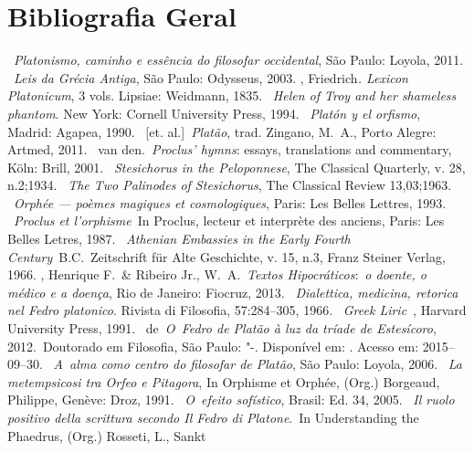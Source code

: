  

 

\section{Bibliografia Geral}


\begin{bibliohedra}
~\emph{Platonismo, caminho e essência do filosofar
  occidental}, São Paulo: Loyola, 2011.
~\emph{Leis da Grécia Antiga}, São Paulo: Odysseus,
  2003.
, Friedrich\emph{. Lexicon Platonicum}, 3 vols. Lipsiae: Weidmann,
  1835.
~\emph{Helen of Troy and her shameless phantom}. New York:
  Cornell University Press, 1994.
~\emph{Platón y el orfismo}, Madrid: Agapea, 1990.
~[et. al.]~\emph{Platão}, trad. Zingano, M.~A., Porto
  Alegre: Artmed, 2011.
~van den.~\emph{Proclus' hymns}: essays, translations and
  commentary, Köln: Brill, 2001.
~\emph{Stesichorus in the Peloponnese}, The Classical
  Quarterly, v. 28, n.2;1934.
~\emph{The Two Palinodes of Stesichorus}, The Classical
  Review 13,03;1963.
~\emph{Orphée --- poèmes magiques et cosmologiques}, Paris:
  Les Belles Lettres, 1993.
~\emph{Proclus et l'orphisme}~In Proclus, lecteur et
  interprète des anciens, Paris: Les Belles Letres, 1987.
~\emph{Athenian Embassies in the Early Fourth
  Century}~B.C.~Zeitschrift für Alte Geschichte, v. 15, n.3, Franz
  Steiner Verlag, 1966.
, Henrique F.~\& Ribeiro Jr., W.~A.~\emph{Textos
  Hipocráticos}:~\emph{o doente, o médico e a doença}, Rio de Janeiro:
  Fiocruz, 2013.
~\emph{Dialettica, medicina, retorica nel Fedro platonico}.
  Rivista di Filosofia, 57:284--305, 1966.
~\emph{Greek Liric}~, Harvard University Press,
  1991.
~de~\emph{O~Fedro de Platão à luz da tríade de
  Estesícoro}, 2012.~Doutorado em Filosofia, São Paulo: "-.
  Disponível em: . Acesso em: 2015--09--30.
~\emph{A~alma como centro do filosofar de Platão}, São
  Paulo: Loyola, 2006.
~\emph{La metempsicosi tra Orfeo e Pitagora}, In
  Orphisme et Orphée, (Org.) Borgeaud, Philippe, Genève: Droz, 1991.
~\emph{O~efeito sofístico}, Brasil: Ed. 34, 2005.
~\emph{Il ruolo positivo della scrittura secondo Il Fedro di
  Platone}.~In Understanding the Phaedrus, (Org.) Rosseti, L., Sankt

\end{bibliohedra}
